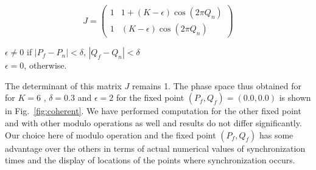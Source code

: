\documentclass[preprint,showpacs,preprintnumbers,amsmath,amssymb]{revtex4-1}
\begin{document}
\begin{minipage}[t]{0.55\textwidth}
\centering
\[ J = \left( \begin{array}{cc}
1 & 1 + (K-\epsilon)\cos(2\pi Q_n)   \\
1 & (K-\epsilon)\cos(2\pi Q_n) \end{array} \right)\]  
\end{minipage}
\begin{minipage}[t]{0.4\textwidth}
\raggedright

\vspace{0.65cm}
$ \epsilon \neq 0$ if $|P_f - P_n| < \delta$, $|Q_f - Q_n| < \delta$\\ $\epsilon = 0$, otherwise.\\
\end{minipage}

\vspace{0.65cm}
The determinant of this matrix $J$ remains 1. The phase space thus obtained for for $K = 6$ , $\delta = 0.3$ and $\epsilon = 2$ for the fixed point $(P_f,Q_f)=(0.0,0.0)$ is shown in Fig.~\ref{fig:coherent}.   We have performed computation for the other fixed point and with other modulo operations as well and results do not differ significantly. Our choice here of modulo operation and the fixed point $(P_f,Q_f)$ has some advantage over the others in terms of actual numerical values of synchronization times and the display of locations of the points where synchronization occurs. 
 
\end{document}
